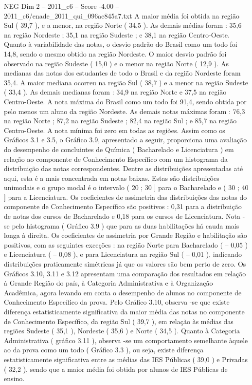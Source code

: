 \begin{textsample}{NEG Dim 2 – 2011\_c6 – Score -4.00 – 2011\_c6/enade\_2011\_qui\_096ae845a7.txt}
A maior média foi obtida na região Sul ( 39,7 ), e a menor, na região Norte ( 34,5 ).
As demais médias foram : 35,6 na região Nordeste ; 35,1 na região Sudeste ; e 38,1 na região Centro-Oeste.
Quanto à variabilidade das notas, o desvio padrão do Brasil como um todo foi 14,8, sendo o mesmo obtido na região Nordeste.
O maior desvio padrão foi observado na região Sudeste ( 15,0 ) e o menor na região Norte ( 12,9 ).
As medianas das notas dos estudantes de todo o Brasil e da região Nordeste foram 35,4.
A maior mediana ocorreu na região Sul ( 38,7 ) e a menor na região Sudeste ( 33,4 ).
As demais medianas foram : 34,9 na região Norte e 37,5 na região Centro-Oeste.
A nota máxima do Brasil como um todo foi 91,4, sendo obtida por pelo menos um aluno da região Nordeste.
As demais notas máximas foram : 76,3 na região Norte ; 87,2 na região Sudeste ; 82,4 na região Sul ; e 85,7 na região Centro-Oeste.
A nota mínima foi zero em todas as regiões.
Assim como os Gráficos 3.1 e 3.5, o Gráfico 3.9, apresentado a seguir, proporciona uma avaliação do desempenho de concluintes de Química ( Bacharelado e Licenciatura ) em relação ao componente de Conhecimento Específico com um histograma da distribuição das notas correspondentes.
Dentre as distribuições apresentadas até aqui, esta é a mais concentrada em notas baixas.
Estas são distribuições unimodais e o grupo modal é o intervalo ( 20 ; 30 ] para o Bacharelado e ( 30 ; 40 ] para a Licenciatura.
Os coeficientes de assimetria das distribuições das notas do componente de Conhecimento Específico são positivos : 0,31 para a distribuição de notas dos cursos de Bacharelado e 0,18 para os cursos de Licenciatura.
Nota -se pelo histograma ( Gráfico 3.9 ) que para as duas habilitações há cauda mais longa à direita.
Os coeficientes de assimetria por Grande Região e habilitação são positivos, com as seguintes exceções : na região Norte para Bacharelado ( – 0,05 ) e Licenciatura ( – 0,08 ), e para Licenciatura na região Sul ( – 0,01 ), indicando distribuições praticamente simétricas já que os valores são bem perto de zero.
Os Gráficos 3.10, 3.11 e 3.12 apresentam uma comparação dos resultados em relação à Grande Região do país, à Categoria Administrativa e à Organização Acadêmica, agora levando em conta o desempenho de alunos no componente de Conhecimento Específico da prova.
Pelo Gráfico 3.10, observa -se que existe diferença estatisticamente significativa da maior média das notas no componente de Conhecimento Específico, da região Sul ( 39,7 ), em relação às médias das regiões Sudeste ( 35,1 ), Nordeste ( 35,6 ) e Norte ( 34,5 ).
Quanto à Categoria Administrativa ( gráfico 3.11 ), observa -se um comportamento semelhante àquele ao da prova como um todo ( Gráfico 3.3 ), ou seja, existe diferença estatisticamente significativa entre as médias das IES Públicas ( 39,0 ) e Privadas ( 32,2 ), sendo que a maior média foi obtida por alunos de IES Públicas de ensino.

\end{textsample}
